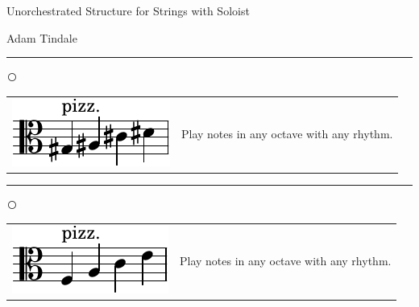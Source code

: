 \documentclass[12pt]{article}
\begin{document}
\begin{center}
{\Huge Unorchestrated Structure for Strings with Soloist}
\end{center}

\vspace{0.2cm}

\begin{flushright}
Adam Tindale
\end{flushright}

\vspace{0.3cm}

\hrule

\vspace{0.1cm}

\textcircled{}

\begin{tabular}{l l}
\begin{minipage}{0.5\textwidth}
\includegraphics[scale=1.5]{gacdaltopizz.pdf}
\end{minipage}
&
\begin{minipage}{0.5\textwidth}
Play notes in any octave with any rhythm.
\end{minipage}
\end{tabular}

\vspace{0.3cm}

\hrule

\vspace{0.1cm}

\textcircled{}


\begin{tabular}{l l}
\begin{minipage}{0.5\textwidth}
\includegraphics[scale=1.5]{facealtopizz.pdf} 
\end{minipage}
&
\begin{minipage}{0.5\textwidth}
Play notes in any octave with any rhythm.
\end{minipage}
\end{tabular}
\end{document}
